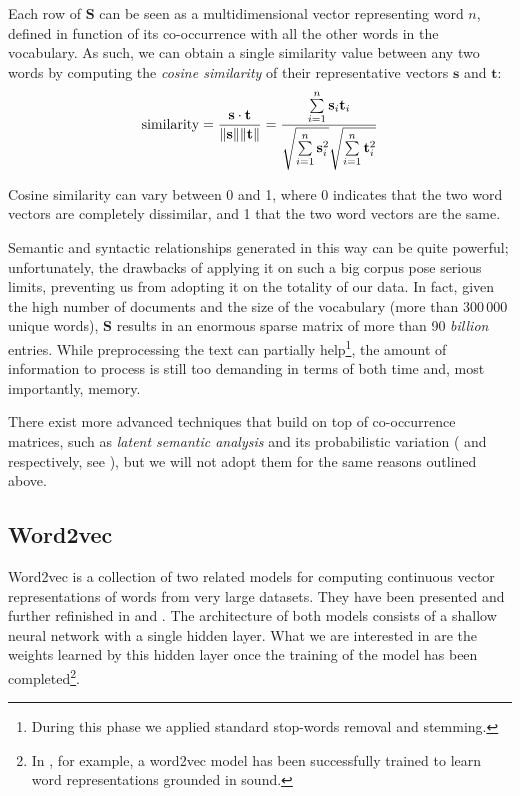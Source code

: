 Each row of $\mathbf{S}$ can be seen as a multidimensional vector representing word $n$, defined in function of its co-occurrence with all the other words in the vocabulary. As such, we can obtain a single similarity value between any two words by computing the \emph{cosine similarity} of their representative vectors $\mathbf{s}$ and $\mathbf{t}$:
\begin{equation} \label{eq:cossim}
\text{similarity} = 
{\mathbf{s} \cdot \mathbf{t} \over \|\mathbf{s}\| \|\mathbf{t}\|} = 
\frac
{ \sum\limits_{i=1}^{n}{\mathbf{s}_i \mathbf{t}_i} }
{ \sqrt{\sum\limits_{i=1}^{n}{\mathbf{s}_i^2}} \sqrt{\sum\limits_{i=1}^{n}{\mathbf{t}_i^2}} }
\end{equation}

Cosine similarity can vary between 0 and 1, where 0 indicates that the two word vectors are completely dissimilar, and 1 that the two word vectors are the same.

Semantic and syntactic relationships generated in this way can be quite powerful; unfortunately, the drawbacks of applying it on such a big corpus pose serious limits, preventing us from adopting it on the totality of our data. In fact, given the high number of documents and the size of the vocabulary (more than 300\,000 unique words), $\mathbf{S}$ results in an enormous sparse matrix of more than 90 \emph{billion} entries. While preprocessing the text can partially help\footnote{During this phase we applied standard stop-words removal and stemming.}, the amount of information to process is still too demanding in terms of both time and, most importantly, memory.

There exist more advanced techniques that build on top of co-occurrence matrices, such as \emph{latent semantic analysis} and its probabilistic variation ( and  respectively, see \cite{hofmann1999probabilistic}), but we will not adopt them for the same reasons outlined above.

\subsection{Word2vec}
Word2vec is a collection of two related models for computing continuous vector representations of words from very large datasets. They have been presented and further refinished in \cite{mikolov2013distributed} and \cite{mikolov2013efficient}. The architecture of both models consists of a shallow neural network with a single hidden layer. What we are interested in are the weights learned by this hidden layer once the training of the model has been completed\footnote{In \cite{vijayakumar2017sound}, for example, a word2vec model has been successfully trained to learn word representations grounded in sound.}.

